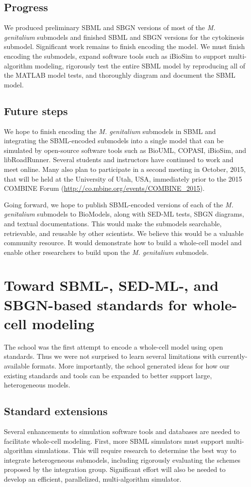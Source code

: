 \documentclass[journal,transmag]{IEEEtran}
\begin{document}
\subsection{Progress}
We produced preliminary SBML and SBGN versions of most of the \textit{M. genitalium} submodels and finished SBML and SBGN versions for the cytokinesis submodel. Significant work remains to finish encoding the model. We must finish encoding the submodels, expand software tools such as iBioSim to support multi-algorithm modeling, rigorously test the entire SBML model by reproducing all of the MATLAB model tests, and thoroughly diagram and document the SBML model.

\subsection{Future steps}
We hope to finish encoding the \textit{M. genitalium} submodels in SBML and integrating the SBML-encoded submodels into a single model that can be simulated by open-source software tools such as BioUML, COPASI, iBioSim, and libRoadRunner. Several students and instructors have continued to work and meet online. Many also plan to participate in a second meeting in October, 2015, that will be held at the University of Utah, USA, immediately prior to the 2015 COMBINE Forum (\url{http://co.mbine.org/events/COMBINE_2015}).

Going forward, we hope to publish SBML-encoded versions of each of the \textit{M. genitalium} submodels to BioModels, along with SED-ML tests, SBGN diagrams, and textual documentations. This would make the submodels searchable, retrievable, and reusable by other scientists. We believe this would be a valuable community resource. It would demonstrate how to build a whole-cell model and enable other researchers to build upon the \textit{M. genitalium} submodels.

\section{Toward SBML-, SED-ML-, and SBGN-based standards for whole-cell modeling}
The school was the first attempt to encode a whole-cell model using open standards. Thus we were not surprised to learn several limitations with currently-available formats. More importantly, the school generated ideas for how our existing standards and tools can be expanded to better support large, heterogeneous models.

\subsection{Standard extensions}
Several enhancements to simulation software tools and databases are needed to facilitate whole-cell modeling. First, more SBML simulators must support multi-algorithm simulations. This will require research to determine the best way to integrate heterogeneous submodels, including rigorously evaluating the schemes proposed by the integration group. Significant effort will also be needed to develop an efficient, parallelized, multi-algorithm simulator.
\end{document}
